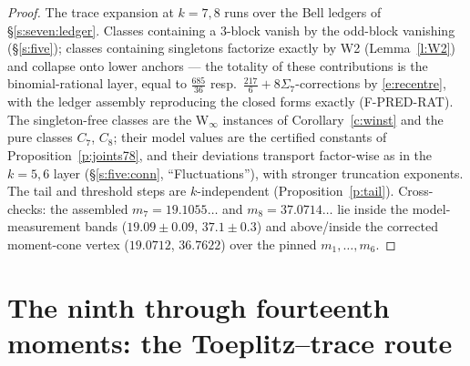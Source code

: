 \documentclass[11pt]{article}
\numberwithin{equation}{section}
\theoremstyle{definition}
\theoremstyle{remark}
\begin{document}
\begin{proof}
The trace expansion at $k=7,8$ runs over the Bell ledgers of
\S\ref{s:seven:ledger}. Classes containing a $3$-block vanish
by the odd-block vanishing (\S\ref{s:five}); classes containing
singletons factorize exactly by W2 (Lemma~\ref{l:W2}) and
collapse onto lower anchors --- the totality of these
contributions is the binomial-rational layer, equal to
$\tfrac{685}{36}$ resp.\ $\tfrac{217}6+8\Sigma_7$-corrections
by \eqref{e:recentre}, with the ledger assembly reproducing the
closed forms exactly (F-PRED-RAT). The singleton-free classes
are the W$_\infty$ instances of Corollary~\ref{c:winst} and
the pure classes $C_7$,
$C_8$; their model values are the certified constants of
Proposition~\ref{p:joints78}, and their deviations transport
factor-wise as in the $k=5,6$ layer (\S\ref{s:five:conn},
``Fluctuations''), with stronger truncation exponents. The
tail and threshold steps are $k$-independent
(Proposition~\ref{p:tail}). Cross-checks: the assembled
$m_7=19.1055\ldots$ and $m_8=37.0714\ldots$ lie inside the
model-measurement bands ($19.09\pm0.09$, $37.1\pm0.3$) and
above/inside the corrected moment-cone vertex
($19.0712$, $36.7622$) over the pinned $m_1,\dots,m_6$.
\end{proof}

\section{The ninth through fourteenth moments: the
Toeplitz--trace route}\label{s:tt}
\end{document}
